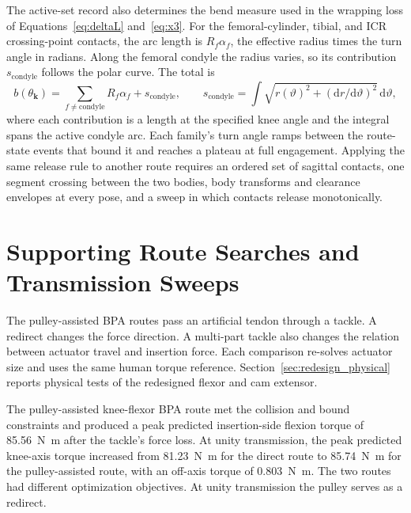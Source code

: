 The active-set record also determines the bend measure used in the wrapping loss of Equations~\eqref{eq:deltaL} and~\eqref{eq:x3}. For the femoral-cylinder, tibial, and ICR crossing-point contacts, the arc length is $R_f\alpha_f$, the effective radius times the turn angle in radians. Along the femoral condyle the radius varies, so its contribution $s_{\mathrm{condyle}}$ follows the polar curve. The total is
\begin{equation}
b(\theta_{\mathbf{k}}) = \sum_{f\ne\mathrm{condyle}} R_f\alpha_f + s_{\mathrm{condyle}}, \qquad
s_{\mathrm{condyle}} = \int \sqrt{r(\vartheta)^2+\left(\mathrm{d}r/\mathrm{d}\vartheta\right)^2}\,\mathrm{d}\vartheta,
\label{eq:app_bend_measure}
\end{equation}
where each contribution is a length at the specified knee angle and the integral spans the active condyle arc. Each family's turn angle ramps between the route-state events that bound it and reaches a plateau at full engagement. Applying the same release rule to another route requires an ordered set of sagittal contacts, one segment crossing between the two bodies, body transforms and clearance envelopes at every pose, and a sweep in which contacts release monotonically.

\section{Supporting Route Searches and Transmission Sweeps}\label{sec:app_routing_extensions}

The pulley-assisted BPA routes pass an artificial tendon through a tackle. A redirect changes the force direction. A multi-part tackle also changes the relation between actuator travel and insertion force. Each comparison re-solves actuator size and uses the same human torque reference. Section~\ref{sec:redesign_physical} reports physical tests of the redesigned flexor and cam extensor.

The pulley-assisted knee-flexor BPA route met the collision and bound constraints and produced a peak predicted insertion-side flexion torque of \qty{85.56}{\newton\meter} after the tackle's force loss. At unity transmission, the peak predicted knee-axis torque increased from \qty{81.23}{\newton\meter} for the direct route to \qty{85.74}{\newton\meter} for the pulley-assisted route, with an off-axis torque of \qty{0.803}{\newton\meter}. The two routes had different optimization objectives. At unity transmission the pulley serves as a redirect.

